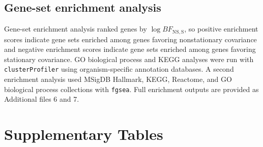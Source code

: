 \subsection{Gene-set enrichment analysis}
Gene-set enrichment analysis ranked genes by \(\log BF_{\mathrm{NS,S}}\), so positive enrichment scores indicate gene sets enriched among genes favoring nonstationary covariance and negative enrichment scores indicate gene sets enriched among genes favoring stationary covariance. GO biological process and KEGG analyses were run with \texttt{clusterProfiler} using organism-specific annotation databases. A second enrichment analysis used MSigDB Hallmark, KEGG, Reactome, and GO biological process collections with \texttt{fgsea}. Full enrichment outputs are provided as Additional files 6 and 7.

\section{Supplementary Tables}


\begin{landscape}
\end{landscape}


\begin{landscape}
\end{landscape}

